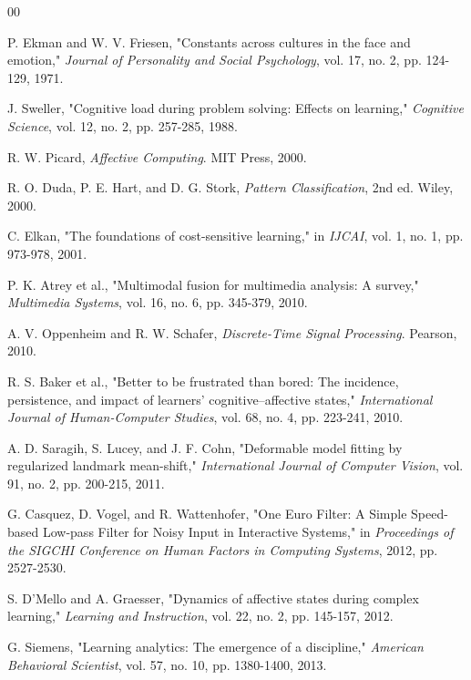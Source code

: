 \documentclass[conference]{IEEEtran}
\begin{document}
\begin{thebibliography}{00}

 P. Ekman and W. V. Friesen, "Constants across cultures in the face and emotion," \textit{Journal of Personality and Social Psychology}, vol. 17, no. 2, pp. 124-129, 1971.

 J. Sweller, "Cognitive load during problem solving: Effects on learning," \textit{Cognitive Science}, vol. 12, no. 2, pp. 257-285, 1988.

 R. W. Picard, \textit{Affective Computing}. MIT Press, 2000.

 R. O. Duda, P. E. Hart, and D. G. Stork, \textit{Pattern Classification}, 2nd ed. Wiley, 2000.

 C. Elkan, "The foundations of cost-sensitive learning," in \textit{IJCAI}, vol. 1, no. 1, pp. 973-978, 2001.

 P. K. Atrey et al., "Multimodal fusion for multimedia analysis: A survey," \textit{Multimedia Systems}, vol. 16, no. 6, pp. 345-379, 2010.

 A. V. Oppenheim and R. W. Schafer, \textit{Discrete-Time Signal Processing}. Pearson, 2010.

 R. S. Baker et al., "Better to be frustrated than bored: The incidence, persistence, and impact of learners’ cognitive–affective states," \textit{International Journal of Human-Computer Studies}, vol. 68, no. 4, pp. 223-241, 2010.

 A. D. Saragih, S. Lucey, and J. F. Cohn, "Deformable model fitting by regularized landmark mean-shift," \textit{International Journal of Computer Vision}, vol. 91, no. 2, pp. 200-215, 2011.

 G. Casquez, D. Vogel, and R. Wattenhofer, "One Euro Filter: A Simple Speed-based Low-pass Filter for Noisy Input in Interactive Systems," in \textit{Proceedings of the SIGCHI Conference on Human Factors in Computing Systems}, 2012, pp. 2527-2530.

 S. D'Mello and A. Graesser, "Dynamics of affective states during complex learning," \textit{Learning and Instruction}, vol. 22, no. 2, pp. 145-157, 2012.

 G. Siemens, "Learning analytics: The emergence of a discipline," \textit{American Behavioral Scientist}, vol. 57, no. 10, pp. 1380-1400, 2013.


\end{thebibliography}
\end{document}
